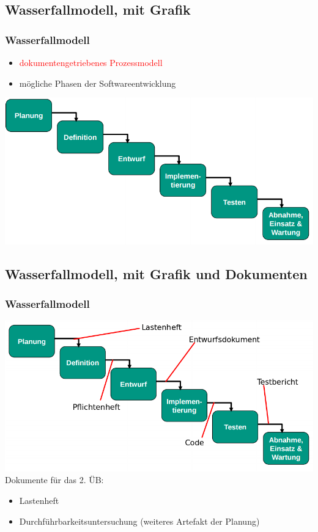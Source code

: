 \documentclass[18pt]{beamer}
\begin{document}
	\subsection{Wasserfallmodell, mit Grafik}
	\begin{frame}
		\frametitle{Wasserfallmodell}
		\begin{itemize}
			\item \textcolor{red}{dokumentengetriebenes Prozessmodell} \pause
			\item mögliche Phasen der Softwareentwicklung \pause
		\end{itemize}
		\includegraphics[scale=0.4]{./pics/tut1/waterfall_without-docs.png}
	\end{frame}
	
	\subsection{Wasserfallmodell, mit Grafik und Dokumenten}
	\begin{frame}
		\frametitle{Wasserfallmodell}
		\includegraphics[scale=0.4]{./pics/tut1/waterfall_with-docs.png}
		\pause
		Dokumente für das 2. ÜB: 
		\begin{itemize}
			\item Lastenheft
			\item Durchführbarkeitsuntersuchung (weiteres Artefakt der Planung)
		\end{itemize}
	\end{frame}
\end{document}
